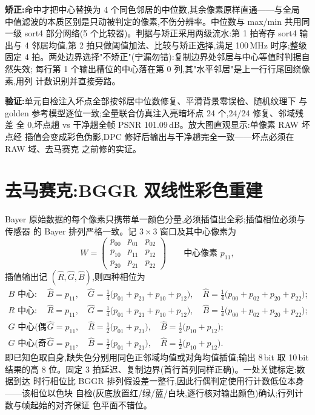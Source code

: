 \textbf{矫正:}命中才把中心替换为 4 个同色邻居的中位数,其余像素原样直通——与全局
中值滤波的本质区别是只动被判定的像素,不伤分辨率。中位数与 max/min 共用同一级
sort4 部分网络(5 个比较器)。判据与矫正采用两级流水:第 1 拍寄存 sort4 输出与
4 邻居均值,第 2 拍只做阈值加法、比较与矫正选择,满足 100\,MHz 时序;整级固定
4 拍。两处边界选择"不矫正"(宁漏勿错):复制边界处邻居与中心等值时判据自然失效;
每行第 1 个输出槽位的中心落在第 0 列,其"水平邻居"是上一行行尾回绕像素,用列
计数识别并直接旁路。

\textbf{验证:}单元自检注入坏点全部按邻居中位数修复、平滑背景零误检、随机纹理下
与 golden 参考模型逐位一致;全量联合仿真注入亮暗坏点 24 个,24/24 修复、邻域残差
全 0,坏点趟 vs 干净趟全帧 PSNR 101.09\,dB。放大图直观显示:单像素 RAW 坏点经
插值会变成彩色伪影,DPC 修好后输出与干净趟完全一致——坏点必须在 RAW 域、去马赛克
之前修的实证。

\section{去马赛克:BGGR 双线性彩色重建}

Bayer 原始数据的每个像素只携带单一颜色分量,必须插值出全彩;插值相位必须与传感器
的 Bayer 排列严格一致。记 $3\times3$ 窗口及其中心像素为
\begin{equation*}
W=\begin{pmatrix}p_{00}&p_{01}&p_{02}\\ p_{10}&p_{11}&p_{12}\\ p_{20}&p_{21}&p_{22}\end{pmatrix}
\qquad\text{中心像素 }p_{11},
\end{equation*}
插值输出记 $(\hat R,\hat G,\hat B)$,则四种相位为
\begin{align*}
B\text{ 中心:}\quad & \hat B=p_{11},\quad \hat G=\tfrac{1}{4}\bigl(p_{01}+p_{21}+p_{10}+p_{12}\bigr),\quad \hat R=\tfrac{1}{4}\bigl(p_{00}+p_{02}+p_{20}+p_{22}\bigr);\\
R\text{ 中心:}\quad & \hat R=p_{11},\quad \hat G=\tfrac{1}{4}\bigl(p_{01}+p_{21}+p_{10}+p_{12}\bigr),\quad \hat B=\tfrac{1}{4}\bigl(p_{00}+p_{02}+p_{20}+p_{22}\bigr);\\
G\text{ 中心(偶行):}\quad & \hat G=p_{11},\quad \hat R=\tfrac{1}{2}\bigl(p_{01}+p_{21}\bigr),\quad \hat B=\tfrac{1}{2}\bigl(p_{10}+p_{12}\bigr);\\
G\text{ 中心(奇行):}\quad & \hat G=p_{11},\quad \hat B=\tfrac{1}{2}\bigl(p_{01}+p_{21}\bigr),\quad \hat R=\tfrac{1}{2}\bigl(p_{10}+p_{12}\bigr).
\end{align*}
即已知色取自身,缺失色分别用同色正邻域均值或对角均值插值;输出 8\,bit 取 10\,bit
结果的高 8 位。固定 3 拍延迟、复制边界(首行首列同样正确)。一处关键标定:数据到达
时行相位比 BGGR 排列假设差一整行,因此行偶判定使用行计数低位本身——该相位以色块
自检(灰底放置红/绿/蓝/白块,逐行核对输出颜色)确认;行列计数与帧起始的对齐保证
色平面不错位。

